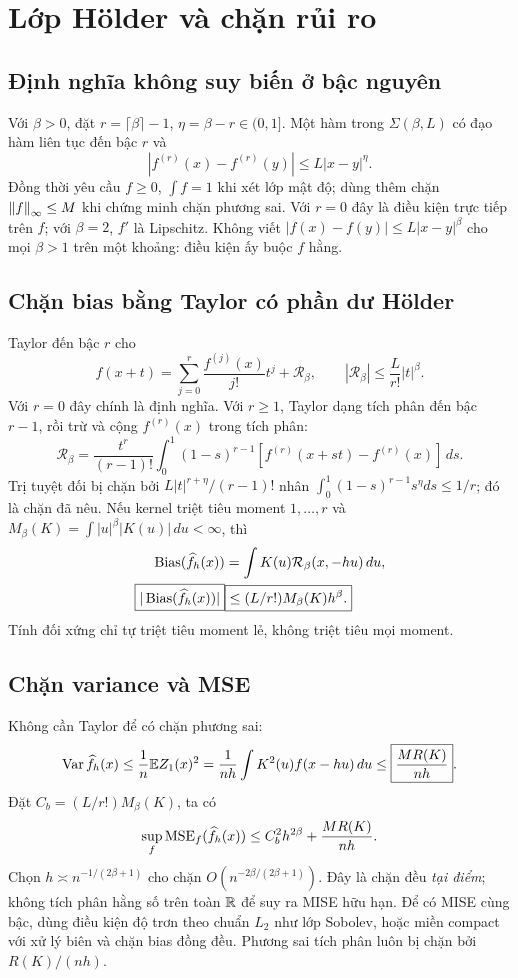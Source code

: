 \section{Lớp Hölder và chặn rủi ro}
\subsection{Định nghĩa không suy biến ở bậc nguyên}
Với $\beta>0$, đặt $r=\lceil\beta\rceil-1$, $\eta=\beta-r\in(0,1]$.
Một hàm trong $\Sigma(\beta,L)$ có đạo hàm liên tục đến bậc $r$ và
\[
|f^{(r)}(x)-f^{(r)}(y)|\leq L|x-y|^\eta.
\]
Đồng thời yêu cầu $f\geq0$, $\int f=1$ khi xét lớp mật độ;
dùng thêm chặn $\left\lVert f\right\rVert_\infty\leq M$ khi chứng minh chặn phương sai.
Với $r=0$ đây là điều kiện trực tiếp trên $f$; với $\beta=2$, $f'$ là
Lipschitz. Không viết $|f(x)-f(y)|\leq L|x-y|^\beta$ cho mọi
$\beta>1$ trên một khoảng: điều kiện ấy buộc $f$ hằng.

\subsection{Chặn bias bằng Taylor có phần dư Hölder}
Taylor đến bậc $r$ cho
\[
f(x+t)=\sum_{j=0}^r\frac{f^{(j)}(x)}{j!}t^j+\mathcal R_\beta,
\qquad |\mathcal R_\beta|\leq\frac{L}{r!}|t|^\beta.
\]
Với $r=0$ đây chính là định nghĩa. Với $r\geq1$, Taylor dạng tích phân
đến bậc $r-1$, rồi trừ và cộng $f^{(r)}(x)$ trong tích phân:
\[
\mathcal R_\beta=
\frac{t^r}{(r-1)!}\int_0^1(1-s)^{r-1}
[f^{(r)}(x+st)-f^{(r)}(x)]\,ds.
\]
Trị tuyệt đối bị chặn bởi $L|t|^{r+\eta}/(r-1)!$ nhân
$\int_0^1(1-s)^{r-1}s^\eta ds\leq1/r$; đó là chặn đã nêu.
Nếu kernel triệt tiêu moment $1,\ldots,r$ và
$M_\beta(K)=\int|u|^\beta|K(u)|\,du<\infty$, thì
\begin{align*}
\operatorname{Bias}(\widehat f_h(x))&=\int K(u)\mathcal R_\beta(x,-hu)\,du,\\
\boxed{|\operatorname{Bias}(\widehat f_h(x))|}&\boxed{\leq (L/r!)M_\beta(K)h^\beta.}
\end{align*}
Tính đối xứng chỉ tự triệt tiêu moment lẻ, không triệt tiêu mọi moment.

\subsection{Chặn variance và MSE}
Không cần Taylor để có chặn phương sai:
\[
\operatorname{Var}\widehat f_h(x)\leq\frac1n\mathbb E Z_1(x)^2
=\frac1{nh}\int K^2(u)f(x-hu)\,du
\leq\boxed{\frac{MR(K)}{nh}}.
\]
Đặt $C_b=(L/r!)M_\beta(K)$, ta có
\[
\sup_f\operatorname{MSE}_f(\widehat f_h(x))\leq C_b^2h^{2\beta}+\frac{MR(K)}{nh}.
\]
Chọn $h\asymp n^{-1/(2\beta+1)}$ cho chặn
$O(n^{-2\beta/(2\beta+1)})$. Đây là chặn đều \emph{tại điểm}; không
tích phân hằng số trên toàn $\mathbb R$ để suy ra MISE hữu hạn.
Để có MISE cùng bậc, dùng điều kiện độ trơn theo chuẩn $L_2$ như lớp
Sobolev, hoặc miền compact với xử lý biên và chặn bias đồng đều.
Phương sai tích phân luôn bị chặn bởi $R(K)/(nh)$.

